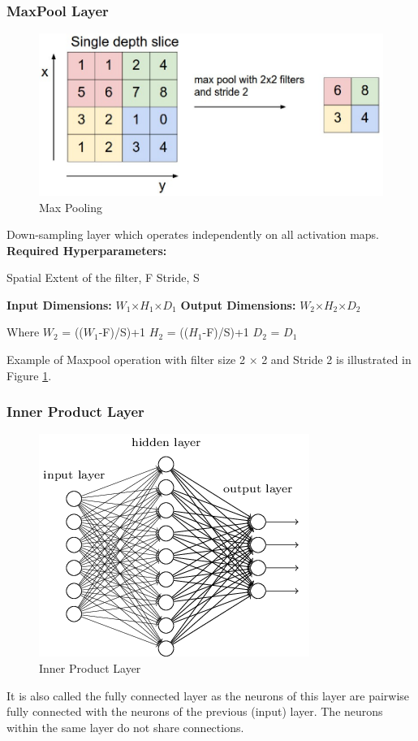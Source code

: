 \subsubsection{MaxPool Layer}
\begin{figure}[h!]
\centering
\includegraphics[width=0.7\linewidth]{figures/maxpool.PNG}
\caption{Max Pooling
\cite{cnn_ak}}
\label{fig:maxpool}
\end{figure}
Down-sampling layer which operates independently on all activation maps.
\textbf{Required Hyperparameters:}
  \begin{adjustwidth}{2cm}{}
  Spatial Extent of the filter, F \newline
  Stride, S 
  \end{adjustwidth}
\textbf{Input Dimensions:} $W_1$×$H_1$×$D_1$ \newline
\textbf{Output Dimensions:} $W_2$×$H_2$×$D_2$ 
  \begin{adjustwidth}{2cm}{}
  Where \newline
  $W_2$ = (($W_1$-F)/S)+1 \newline
  $H_2$ = (($H_1$-F)/S)+1 \newline
  $D_2$ = $D_1$
  \end{adjustwidth}
Example of Maxpool operation with filter size 2 × 2 and Stride 2 is illustrated in Figure \ref{fig:maxpool}.
\subsubsection{Inner Product Layer}
\begin{figure}[h!]
  \centering
  \includegraphics[width=0.5\linewidth]{figures/FCLayer.png}
  \caption{Inner Product Layer
  \cite{cnn_ak}}
  \label{fig:FCLayer}
\end{figure}
It is also called the fully connected layer as the neurons of this layer are pairwise fully connected with the neurons of the previous (input) layer. The neurons within the same layer do not share connections.
